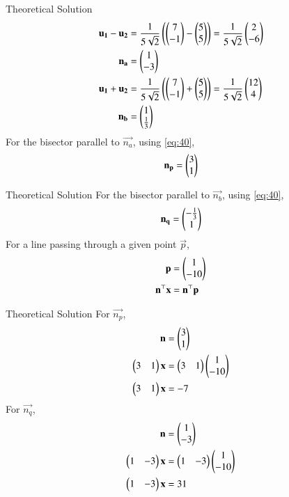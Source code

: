 \documentclass{beamer}
\begin{document}
\begin{frame}{Theoretical Solution}
\begin{align}
    \mathbf{u_1} - \mathbf{u_2} &= \frac{1}{5\sqrt{2}}\left(\begin{pmatrix}7 \\ -1\end{pmatrix} - \begin{pmatrix}5 \\ 5\end{pmatrix}\right) = \frac{1}{5\sqrt{2}}\begin{pmatrix}2 \\ -6\end{pmatrix} \\
    \mathbf{n_a} &= \begin{pmatrix}1 \\ -3\end{pmatrix} \\
    \mathbf{u_1} + \mathbf{u_2} &= \frac{1}{5\sqrt{2}}\left(\begin{pmatrix}7 \\ -1\end{pmatrix} + \begin{pmatrix}5 \\ 5\end{pmatrix}\right) = \frac{1}{5\sqrt{2}}\begin{pmatrix}12 \\ 4\end{pmatrix} \\
    \mathbf{n_b} &= \begin{pmatrix}1 \\ \frac{1}{3}\end{pmatrix}
\end{align}
For the bisector parallel to $\vec{n_a}$, using \eqref{eq:40},
\begin{align}
    \mathbf{n_p} = \begin{pmatrix}3 \\ 1\end{pmatrix}
\end{align}
\end{frame}

\begin{frame}{Theoretical Solution}
For the bisector parallel to $\vec{n_b}$, using \eqref{eq:40},
\begin{align}    
    \mathbf{n_q} = \begin{pmatrix}-\frac{1}{3} \\ 1\end{pmatrix}
\end{align}
For a line passing through a given point $\vec{p}$,
\begin{align}
    \mathbf{p} &= \begin{pmatrix}1 \\ -10\end{pmatrix} \\
    \mathbf{n}^\top\mathbf{x} &= \mathbf{n}^\top\mathbf{p}
\end{align}
\end{frame}

\begin{frame}{Theoretical Solution}
For $\vec{n_p}$,
\begin{align}
    \mathbf{n} &= \begin{pmatrix}3 \\ 1\end{pmatrix} \\
    \begin{pmatrix}3 & 1\end{pmatrix}\mathbf{x} &= \begin{pmatrix}3 & 1\end{pmatrix}\begin{pmatrix}1 \\ -10\end{pmatrix} \\
    \begin{pmatrix}3 & 1\end{pmatrix}\mathbf{x} &= -7
\end{align}
For $\vec{n_q}$,
\begin{align}
    \mathbf{n} &= \begin{pmatrix}1 \\ -3\end{pmatrix} \\
    \begin{pmatrix}1 & -3\end{pmatrix}\mathbf{x} &= \begin{pmatrix}1 & -3\end{pmatrix}\begin{pmatrix}1 \\ -10\end{pmatrix} \\
    \begin{pmatrix}1 & -3\end{pmatrix}\mathbf{x} &= 31
\end{align}
\end{frame}
\end{document}
